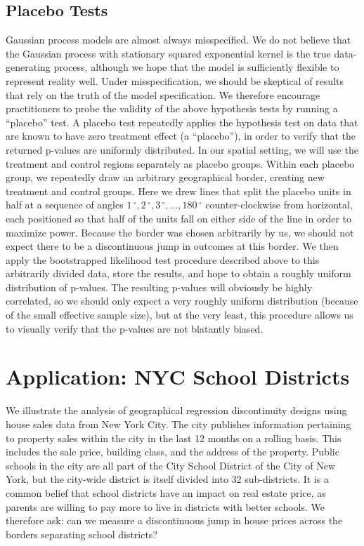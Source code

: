 \documentclass[letter,12pt]{article}
\newcommand{\degree}{{\,^\circ}}
\begin{document}
\hypertarget{placebo-tests}{%
\subsection{Placebo Tests}\label{placebo-tests}}


\label{sec:placebo}
Gaussian process models are almost always misspecified.
We do not believe that the Gaussian process with stationary squared exponential kernel is the true data-generating process, although we hope that the model is sufficiently flexible to represent reality well.
Under misspecification, we should be skeptical of results that rely on the truth of the model specification.
We therefore encourage practitioners to probe the validity of the above hypothesis tests by running a ``placebo'' test.
A placebo test repeatedly applies the hypothesis test on data that are known to have zero treatment effect (a ``placebo''),
in order to verify that the returned p-values are uniformly distributed.
In our spatial setting, we will use the treatment and control regions separately as placebo groups.
Within each placebo group, we repeatedly draw an arbitrary geographical border, creating new treatment and control groups.
Here we drew lines that split the placebo units in half at a sequence of angles \(1\degree,2\degree,3\degree,\dotsc,180\degree\) counter-clockwise from horizontal, each positioned so that half of the units fall on either side of the line in order to maximize power.
Because the border was chosen arbitrarily by us, we should not expect there to be a discontinuous jump in outcomes at this border.
We then apply the bootstrapped likelihood test procedure described above to this arbitrarily divided data, store the results, and hope to obtain a roughly uniform distribution of p-values.
The resulting p-values will obviously be highly correlated, so we should only expect a very roughly uniform distribution (because of the small effective sample size), but at the very least, this procedure allows us to visually verify that the p-values are not blatantly biased.



\hypertarget{example-nyc-school-districts}{%
\section{Application: NYC School Districts}\label{application-nyc-school-districts}}

\label{sec:NYC_example}

We illustrate the analysis of geographical regression discontinuity designs using house sales data from New York City.
The city publishes information pertaining to property sales within the city in the last 12 months on a rolling basis.
This includes the sale price, building class, and the address of the property.
Public schools in the city are all part of the City School District of the City of New York, but the city-wide district is itself divided into 32 sub-districts.
It is a common belief that school districts have an impact on real estate price, as parents are willing to pay more to live in districts with better schools.
We therefore ask: can we measure a discontinuous jump in house prices across the borders separating school districts?
\end{document}
